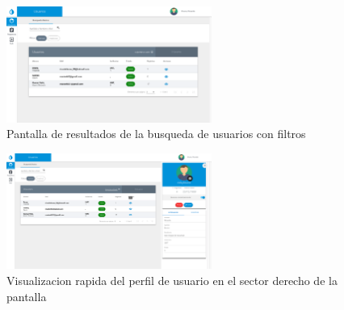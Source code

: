 			
				\begin{figure}
					\centering
						\includegraphics[width=0.6\textwidth]{Screenshots/web/usuarioListar.png}
								\caption{Pantalla de resultados de la busqueda de usuarios con filtros}
						
				\end{figure}

			
				\begin{figure}
					\centering
						\includegraphics[width=0.6\textwidth]{Screenshots/web/usuarioVer.png}
								\caption{Visualizacion rapida del perfil de usuario en el sector derecho de la pantalla}

				\end{figure}
